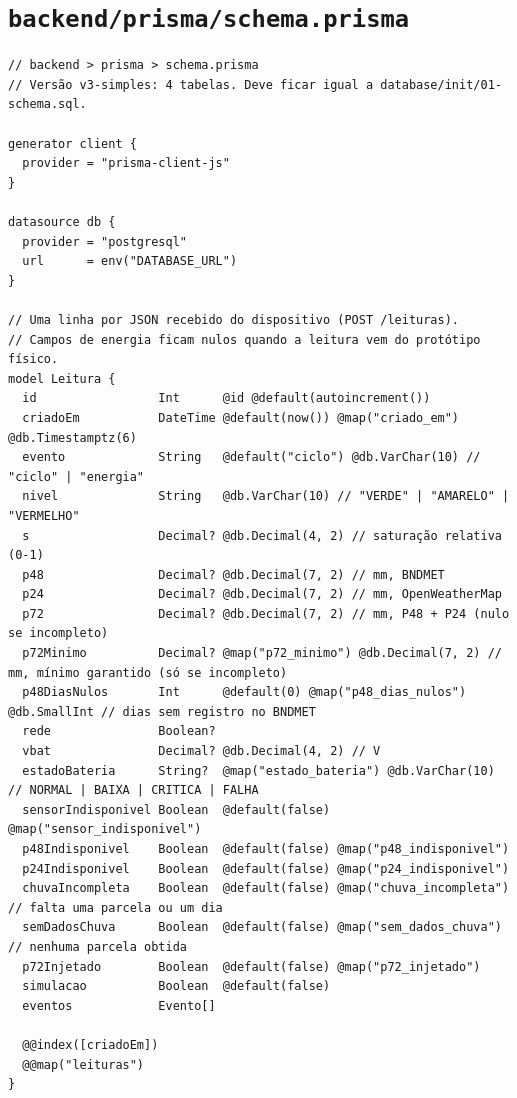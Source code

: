 \section*{\texttt{backend/prisma/schema.prisma}}
\begin{lstlisting}[language=Prisma]
// backend > prisma > schema.prisma
// Versão v3-simples: 4 tabelas. Deve ficar igual a database/init/01-schema.sql.

generator client {
  provider = "prisma-client-js"
}

datasource db {
  provider = "postgresql"
  url      = env("DATABASE_URL")
}

// Uma linha por JSON recebido do dispositivo (POST /leituras).
// Campos de energia ficam nulos quando a leitura vem do protótipo físico.
model Leitura {
  id                 Int      @id @default(autoincrement())
  criadoEm           DateTime @default(now()) @map("criado_em") @db.Timestamptz(6)
  evento             String   @default("ciclo") @db.VarChar(10) // "ciclo" | "energia"
  nivel              String   @db.VarChar(10) // "VERDE" | "AMARELO" | "VERMELHO"
  s                  Decimal? @db.Decimal(4, 2) // saturação relativa (0-1)
  p48                Decimal? @db.Decimal(7, 2) // mm, BNDMET
  p24                Decimal? @db.Decimal(7, 2) // mm, OpenWeatherMap
  p72                Decimal? @db.Decimal(7, 2) // mm, P48 + P24 (nulo se incompleto)
  p72Minimo          Decimal? @map("p72_minimo") @db.Decimal(7, 2) // mm, mínimo garantido (só se incompleto)
  p48DiasNulos       Int      @default(0) @map("p48_dias_nulos") @db.SmallInt // dias sem registro no BNDMET
  rede               Boolean?
  vbat               Decimal? @db.Decimal(4, 2) // V
  estadoBateria      String?  @map("estado_bateria") @db.VarChar(10) // NORMAL | BAIXA | CRITICA | FALHA
  sensorIndisponivel Boolean  @default(false) @map("sensor_indisponivel")
  p48Indisponivel    Boolean  @default(false) @map("p48_indisponivel")
  p24Indisponivel    Boolean  @default(false) @map("p24_indisponivel")
  chuvaIncompleta    Boolean  @default(false) @map("chuva_incompleta") // falta uma parcela ou um dia
  semDadosChuva      Boolean  @default(false) @map("sem_dados_chuva") // nenhuma parcela obtida
  p72Injetado        Boolean  @default(false) @map("p72_injetado")
  simulacao          Boolean  @default(false)
  eventos            Evento[]

  @@index([criadoEm])
  @@map("leituras")
}


\end{lstlisting}
